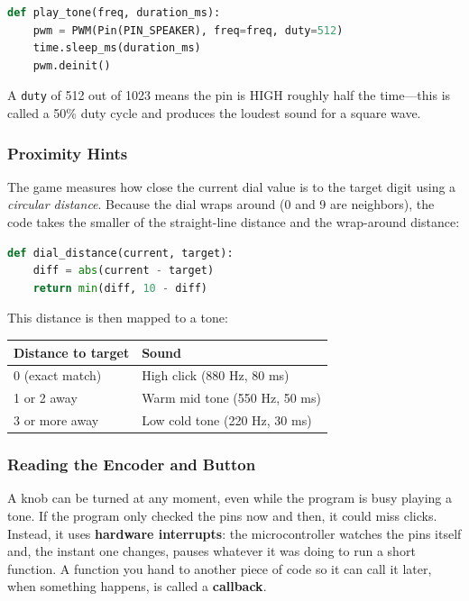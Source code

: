 \begin{lstlisting}[language=Python, caption=PWM tone helper]
def play_tone(freq, duration_ms):
    pwm = PWM(Pin(PIN_SPEAKER), freq=freq, duty=512)
    time.sleep_ms(duration_ms)
    pwm.deinit()
\end{lstlisting}

A \texttt{duty} of 512 out of 1023 means the pin is HIGH roughly half the time—this is
called a 50\% duty cycle and produces the loudest sound for a square wave.

\subsubsection{Proximity Hints}

The game measures how close the current dial value is to the target digit using a
\emph{circular distance}. Because the dial wraps around (0 and 9 are neighbors), the code
takes the smaller of the straight-line distance and the wrap-around distance:

\begin{lstlisting}[language=Python, caption=Circular distance on a 0-9 dial]
def dial_distance(current, target):
    diff = abs(current - target)
    return min(diff, 10 - diff)
\end{lstlisting}

This distance is then mapped to a tone:

\begin{center}
\begin{tabular}{|l|l|}
    \hline
    \textbf{Distance to target} & \textbf{Sound} \\
    \hline
    0 (exact match)             & High click (880 Hz, 80 ms) \\
    1 or 2 away                 & Warm mid tone (550 Hz, 50 ms) \\
    3 or more away              & Low cold tone (220 Hz, 30 ms) \\
    \hline
\end{tabular}
\end{center}

\subsubsection{Reading the Encoder and Button}

A knob can be turned at any moment, even while the program is busy playing a tone. If the
program only checked the pins now and then, it could miss clicks. Instead, it uses
\textbf{hardware interrupts}: the microcontroller watches the pins itself and, the instant one
changes, pauses whatever it was doing to run a short function. A function you hand to another
piece of code so it can call it later, when something happens, is called a \textbf{callback}.

